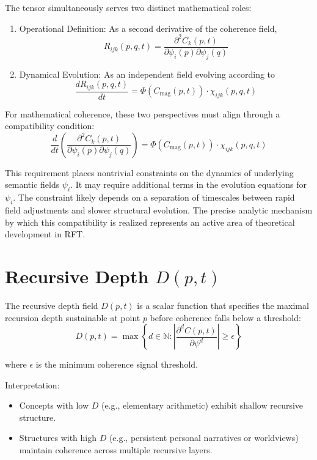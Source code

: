 The tensor simultaneously serves two distinct mathematical roles:
\begin{enumerate}
    \item Operational Definition: As a second derivative of the coherence field,
    \begin{equation}
    R_{ijk}(p, q, t) = \frac{\partial^2 C_k(p, t)}{\partial \psi_i(p) \partial \psi_j(q)}
    \end{equation}
    \item Dynamical Evolution: As an independent field evolving according to
    \begin{equation}
    \frac{dR_{ijk}(p, q, t)}{dt} = \Phi(C_{\mathrm{mag}}(p, t)) \cdot \chi_{ijk}(p, q, t)
    \end{equation}
\end{enumerate}

For mathematical coherence, these two perspectives must align through a compatibility condition:
\begin{equation}
\frac{d}{dt}\left(\frac{\partial^2 C_k(p, t)}{\partial \psi_i(p) \partial \psi_j(q)}\right) = \Phi(C_{\mathrm{mag}}(p, t)) \cdot \chi_{ijk}(p, q, t)
\end{equation}

This requirement places nontrivial constraints on the dynamics of underlying semantic fields \(\psi_i\). It may require additional terms in the evolution equations for \(\psi_i\). The constraint likely depends on a separation of timescales between rapid field adjustments and slower structural evolution. The precise analytic mechanism by which this compatibility is realized represents an active area of theoretical development in RFT.

\section{Recursive Depth \(D(p, t)\)}

The recursive depth field \(D(p, t)\) is a scalar function that specifies the maximal recursion depth sustainable at point \(p\) before coherence falls below a threshold:
\begin{equation}
D(p, t) = \max \left\{ d \in \mathbb{N} : \left| \frac{\partial^d C(p,t)}{\partial \psi^d} \right| \geq \epsilon \right\}
\end{equation}

where \(\epsilon\) is the minimum coherence signal threshold.

Interpretation:
\begin{itemize}
    \item Concepts with low \(D\) (e.g., elementary arithmetic) exhibit shallow recursive structure.
    \item Structures with high \(D\) (e.g., persistent personal narratives or worldviews) maintain coherence across multiple recursive layers.
\end{itemize}


